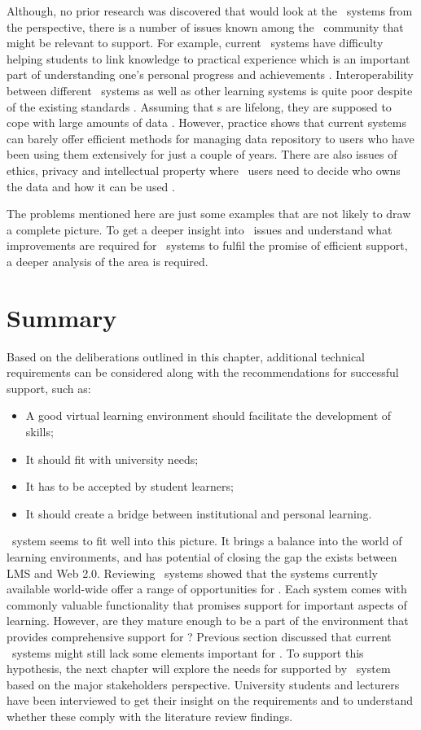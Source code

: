 Although, no prior research was discovered that would look at the \ep~systems
from the \LLLs perspective, there is a number of issues known among the
\ep~community that might be relevant to \LLLs support. For example, current
\ep~systems have difficulty helping students to link knowledge to practical
experience which is an important part of understanding one's personal progress
and achievements \citep{Chou2009}. Interoperability between different
\ep~systems as well as other learning systems is quite poor despite of the
existing standards \citep{Clark2011}. Assuming that \ep s are lifelong, they are
supposed to cope with large amounts of data \citep{Butler2010}. However,
practice shows that current systems can barely offer efficient methods for
managing data repository to users who have been using them extensively for just
a couple of years. There are also issues of ethics, privacy and intellectual
property where \ep~users need to decide who owns the data and how it can be used
\citep{Challis2005}.

The problems mentioned here are just some examples that are not likely to draw a
complete picture. To get a deeper insight into \ep~issues and understand what
improvements are required for \ep~systems to fulfil the promise of efficient
\LLLs support, a deeper analysis of the area is required.

\section{Summary}

Based on the deliberations outlined in this chapter, additional technical
requirements can be considered along with the recommendations for successful
\LLLs support, such as:

\begin{itemize}
	\item A good virtual learning environment should facilitate the development of
	\LLLs skills;
	\item It should fit with university needs;
	\item It has to be accepted by student learners;
	\item It should create a bridge between institutional and personal learning.
\end{itemize}

\ep~system seems to fit well into this picture. It brings a balance into the
world of learning environments, and has potential of closing the gap the exists
between LMS and Web 2.0. Reviewing \ep~systems showed that the systems currently
available world-wide offer a range of opportunities for \LLLsn. Each system
comes with commonly valuable functionality that promises support for important
aspects of learning. However, are they mature enough to be a part of the
environment that provides comprehensive support for \LLLsn? Previous section
discussed that current \ep~systems might still lack some elements important for
\LLLsn. To support this hypothesis, the next chapter will explore the needs for
\LLLs supported by \ep~system based on the major stakeholders perspective.
University students and lecturers have been interviewed to get their insight on
the requirements and to understand whether these comply with the literature
review findings.
